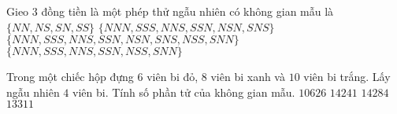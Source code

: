 \begin{ex}%
	Gieo $3$ đồng tiền là một phép thử ngẫu nhiên có không gian mẫu là
	\choice
	{$\{NN,NS,SN,SS\}$}
	{$\{NNN,SSS,NNS,SSN,NSN,SNS\}$}
	{\True $\{NNN,SSS,NNS,SSN,NSN,SNS,NSS,SNN\}$}
	{$\{NNN,SSS,NNS,SSN,NSS,SNN\}$}
\end{ex}
\begin{ex}%
	Trong một chiếc hộp đựng $6$ viên bi đỏ, $8$ viên bi xanh và $10$ viên bi trắng. Lấy ngẫu nhiên $4$ viên bi. Tính số phần tử của không gian mẫu.
	\choice
	{$10626$}
	{$14241$}
	{$14284$}
	{$13311$}
\end{ex}


